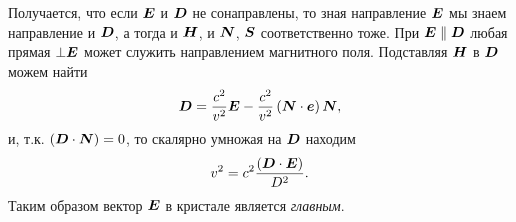 Получается, что если $\mbox{\boldmath $E$}$ и $\mbox{\boldmath $D$}$ не сонаправлены, то зная направление $\mbox{\boldmath $E$}$ мы знаем направление и $\mbox{\boldmath $D$}$, а тогда и $\mbox{\boldmath $H$}$, и $\mbox{\boldmath $N$}$, $\mbox{\boldmath $S$}$ соответственно тоже. 
При $\mbox{\boldmath $E$} \parallel \mbox{\boldmath $D$}$ любая прямая $\bot \mbox{\boldmath $E$}$ может служить направлением магнитного поля. 
Подставляя $\mbox{\boldmath $H$}$ в $\mbox{\boldmath $D$}$ можем найти
\begin{equation*}
    \mbox{\boldmath $D$} = \frac{c^2}{v^2} \mbox{\boldmath $E$} - \frac{c^2}{v^2} \left(\mbox{\boldmath $N$} \cdot \mbox{\boldmath $e$} \right) \mbox{\boldmath $N$},
\end{equation*}
и, т.к. $(\mbox{\boldmath $D$} \cdot \mbox{\boldmath $N$})=0$, то скалярно умножая на $\mbox{\boldmath $D$}$ находим
\begin{equation*}
    v^2 = c^2 \frac{(\mbox{\boldmath $D$} \cdot \mbox{\boldmath $E$})}{D^2}.
\end{equation*}
Таким образом вектор $\mbox{\boldmath $E$}$ в кристале является \textit{главным}.

